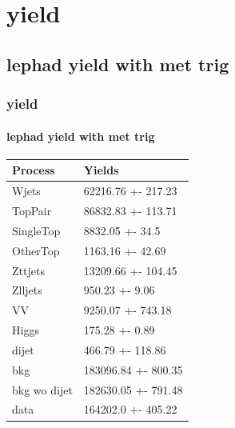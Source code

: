 \documentclass[usenames,dvipsnames]{beamer}
\begin{document}
\section{yield}
\subsection{lephad yield with met trig}
\begin{frame}
\frametitle{yield}
\framesubtitle{lephad yield with met trig}	
\begin{table}[!ht]
    \centering
    \begin{tabular}{|l|l|}
    \hline
        Process & Yields \\ \hline
        Wjets & 62216.76 +- 217.23 \\ \hline
        TopPair & 86832.83 +- 113.71 \\ \hline
        SingleTop & 8832.05 +- 34.5 \\ \hline
        OtherTop & 1163.16 +- 42.69 \\ \hline
        Zttjets & 13209.66 +- 104.45 \\ \hline
        Zlljets & 950.23 +- 9.06 \\ \hline
        VV & 9250.07 +- 743.18 \\ \hline
        Higgs & 175.28 +- 0.89 \\ \hline
        dijet & 466.79 +- 118.86 \\ \hline
        bkg & 183096.84 +- 800.35 \\ \hline
        bkg wo dijet & 182630.05 +- 791.48 \\ \hline
        data & 164202.0 +- 405.22 \\ \hline
    \end{tabular}
\end{table}
\end{frame}
\end{document}

